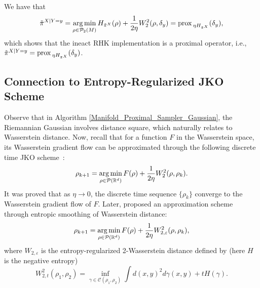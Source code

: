 \begin{lemma}\label{Lemma_proximal_calculation}
    We have that 
    \begin{equation*}
        \tilde{\pi}^{X|Y = y} 
        = \operatorname*{arg\,min}_{\rho \in \mathcal{P}_{2}(M)} H_{\tilde{\pi}^{X}}(\rho) + \frac{1}{2\eta} W_{2}^{2}(\rho, \delta_{y}) = \operatorname{prox\,}_{\eta H_{\tilde{\pi}^{X}}} (\delta_{y}),
\end{equation*}
which shows that the ineact RHK implementation is a proximal operator, i.e., $\tilde{\pi}^{X|Y = y} = \operatorname{prox\,}_{\eta H_{\tilde{\pi}^{X}}} (\delta_{y})$.
\end{lemma}



\subsection{Connection to Entropy-Regularized JKO Scheme}\label{Section_Approximation_JKO}




Observe that in Algorithm \ref{Manifold_Proximal_Sampler_Gaussian}, the Riemannian Gaussian involves distance square, which naturally relates to Wasserstein distance. Now, recall that for a function $F$ in the Wasserstein space, its Wasserstein gradient flow can be approximated through the following discrete time JKO scheme~\citep{jordan1998variational}:
\begin{equation*}
    \rho_{k+1} = \operatorname*{arg\,min}_{\rho \in \mathcal{P}(\mathbb{R}^{d})} F(\rho) + \frac{1}{2\eta} W_{2}^{2} (\rho, \rho_{k}).
\end{equation*}
It was proved that as $\eta \to 0$, the discrete time sequence $\{\rho_{k}\}$ converge to the Wasserstein gradient flow of $F$.
Later, \cite{peyre2015entropic} proposed an approximation scheme through entropic smoothing of Wasserstein distance:
\begin{equation*}
    \rho_{k+1} = \operatorname*{arg\,min}_{\rho \in \mathcal{P}(\mathbb{R}^{d})} F(\rho) + \frac{1}{2\eta} W_{2, \varepsilon}^{2} (\rho, \rho_{k}),
\end{equation*}
where $W_{2, \varepsilon}$ is the entropy-regularized 2-Wasserstein distance defined by (here $H$ is the negative entropy)
\begin{equation*}
    W_{2, t}^{2}(\rho_{1}, \rho_{2}) = \inf_{\gamma \in \mathcal{C}(\rho_{1}, \rho_{2})} \int d(x, y)^{2} d\gamma(x, y) + t H(\gamma).
\end{equation*}


